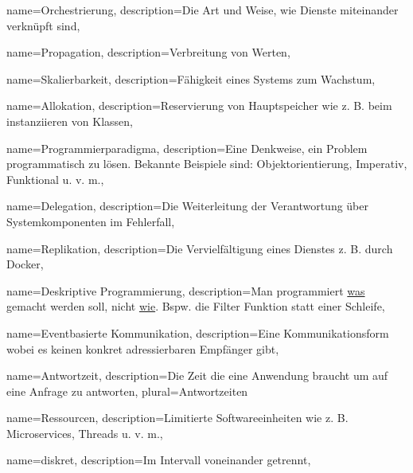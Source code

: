 {name={Orchestrierung},%
 description={Die Art und Weise, wie Dienste miteinander verknüpft sind},%
} 

{name={Propagation},%
 description={Verbreitung von Werten},%
} 

{name={Skalierbarkeit},%
 description={Fähigkeit eines Systems zum Wachstum},%
}

{name={Allokation},%
 description={Reservierung von Hauptspeicher wie z. B. beim in­s­tan­zi­ie­ren von Klassen},%
}

{name={Programmierparadigma},%
 description={Eine Denkweise, ein Problem programmatisch zu lösen. Bekannte Beispiele sind: Objektorientierung, Imperativ, Funktional u. v. m.},%
}

{name={Delegation},%
 description={Die Weiterleitung der Verantwortung über Systemkomponenten im Fehlerfall},%
}

{name={Replikation},%
 description={Die Vervielfältigung eines Dienstes z. B. durch Docker},%
}

{name={Deskriptive Programmierung},%
 description={Man programmiert \underline{was} gemacht werden soll, nicht \underline{wie}. Bspw. die Filter Funktion statt einer Schleife},%
}

{name={Eventbasierte Kommunikation},%
 description={Eine Kommunikationsform wobei es keinen konkret adressierbaren Empfänger gibt},%
}

{name={Antwortzeit},%
 description={Die Zeit die eine Anwendung braucht um auf eine Anfrage zu antworten},%
 plural={Antwortzeiten}
}

{name={Ressourcen},%
 description={Limitierte Softwareeinheiten wie z. B. Microservices, Threads u. v. m.},%
}

{name={diskret},%
 description={Im Intervall voneinander getrennt},%
}

